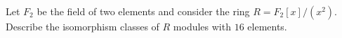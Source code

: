 Let $F_2$ be the field of two elements and consider the ring
$R=F_2[x]/(x^2)$. Describe the isomorphism classes of $R$ modules with
$16$ elements.

